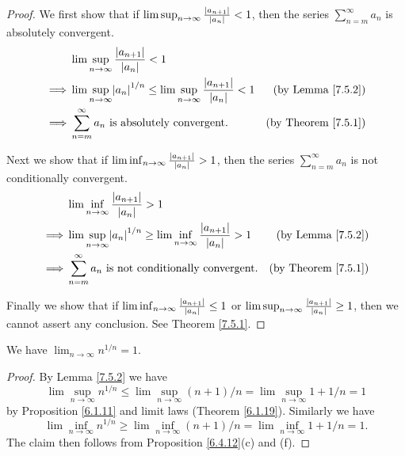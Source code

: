 \begin{proof}
We first show that if \(\lim\sup_{n \to \infty} \frac{\abs*{a_{n + 1}}}{\abs*{a_n}} < 1\), then the series \(\sum_{n = m}^\infty a_n\) is absolutely convergent.
\begin{align*}
& \lim\sup_{n \to \infty} \frac{\abs*{a_{n + 1}}}{\abs*{a_n}} < 1 \\
\implies & \lim\sup_{n \to \infty} \abs*{a_n}^{1 / n} \leq \lim\sup_{n \to \infty} \frac{\abs*{a_{n + 1}}}{\abs*{a_n}} < 1 & \text{(by Lemma \ref{7.5.2})} \\
\implies & \sum_{n = m}^\infty a_n \text{ is absolutely convergent}. & \text{(by Theorem \ref{7.5.1})}
\end{align*}

Next we show that if \(\lim\inf_{n \to \infty} \frac{\abs*{a_{n + 1}}}{\abs*{a_n}} > 1\), then the series \(\sum_{n = m}^\infty a_n\) is not conditionally convergent.
\begin{align*}
& \lim\inf_{n \to \infty} \frac{\abs*{a_{n + 1}}}{\abs*{a_n}} > 1 \\
\implies & \lim\sup_{n \to \infty} \abs*{a_n}^{1 / n} \geq \lim\inf_{n \to \infty} \frac{\abs*{a_{n + 1}}}{\abs*{a_n}} > 1 & \text{(by Lemma \ref{7.5.2})} \\
\implies & \sum_{n = m}^\infty a_n \text{ is not conditionally convergent}. & \text{(by Theorem \ref{7.5.1})}
\end{align*}

Finally we show that if \(\lim\inf_{n \to \infty} \frac{\abs*{a_{n + 1}}}{\abs*{a_n}} \leq 1\) or \(\lim\sup_{n \to \infty} \frac{\abs*{a_{n + 1}}}{\abs*{a_n}} \geq 1\), then we cannot assert any conclusion.
See Theorem \ref{7.5.1}.
\end{proof}

\begin{proposition}\label{7.5.4}
We have \(\lim_{n \to \infty} n^{1 / n} = 1\).
\end{proposition}

\begin{proof}
By Lemma \ref{7.5.2} we have
\[
    \lim\sup_{n \to \infty} n^{1 / n} \leq \lim\sup_{n \to \infty} (n + 1) / n = \lim\sup_{n \to \infty} 1 + 1 / n = 1
\]
by Proposition \ref{6.1.11} and limit laws (Theorem \ref{6.1.19}).
Similarly we have
\[
    \lim\inf_{n \to \infty} n^{1 / n} \geq \lim\inf_{n \to \infty} (n + 1) / n = \lim\inf_{n \to \infty} 1 + 1 / n = 1.
\]
The claim then follows from Proposition \ref{6.4.12}(c) and (f).
\end{proof}

